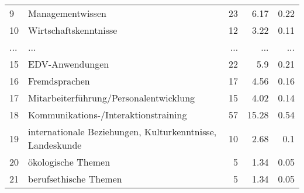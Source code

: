 \begin{longtable}{lXrrr}
        9 & \multicolumn{1}{X}{Managementwissen} & %
          \num{23} &
          \num[round-mode=places,round-precision=2]{6.17} &
          \num[round-mode=places,round-precision=2]{0.22} \\
        10 & \multicolumn{1}{X}{Wirtschaftskenntnisse} & %
          \num{12} &
          \num[round-mode=places,round-precision=2]{3.22} &
          \num[round-mode=places,round-precision=2]{0.11} \\
       ... & ... & ... & ... & ... \\
        15 & \multicolumn{1}{X}{EDV-Anwendungen} & %
          \num{22} &
          \num[round-mode=places,round-precision=2]{5.9} &
          \num[round-mode=places,round-precision=2]{0.21} \\

        16 & \multicolumn{1}{X}{Fremdsprachen} & %
          \num{17} &
          \num[round-mode=places,round-precision=2]{4.56} &
          \num[round-mode=places,round-precision=2]{0.16} \\

        17 & \multicolumn{1}{X}{Mitarbeiterführung/Personalentwicklung} & %
          \num{15} &
          \num[round-mode=places,round-precision=2]{4.02} &
          \num[round-mode=places,round-precision=2]{0.14} \\

        18 & \multicolumn{1}{X}{Kommunikations-/Interaktionstraining} & %
          \num{57} &
          \num[round-mode=places,round-precision=2]{15.28} &
          \num[round-mode=places,round-precision=2]{0.54} \\

        19 & \multicolumn{1}{X}{internationale Beziehungen, Kulturkenntnisse, Landeskunde} & %
          \num{10} &
          \num[round-mode=places,round-precision=2]{2.68} &
          \num[round-mode=places,round-precision=2]{0.1} \\

        20 & \multicolumn{1}{X}{ökologische Themen} & %
          \num{5} &
          \num[round-mode=places,round-precision=2]{1.34} &
          \num[round-mode=places,round-precision=2]{0.05} \\

        21 & \multicolumn{1}{X}{berufsethische Themen} & %
          \num{5} &
          \num[round-mode=places,round-precision=2]{1.34} &
          \num[round-mode=places,round-precision=2]{0.05} \\


\end{longtable}
